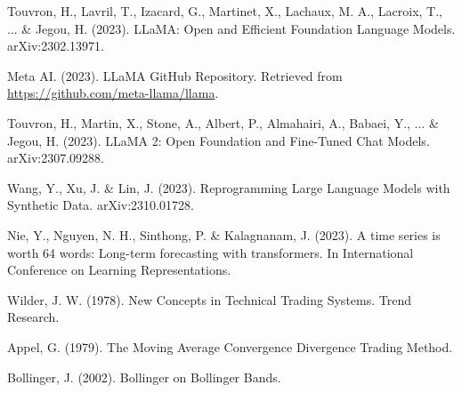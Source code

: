 \begin{thebibliography}{99}
	 Touvron, H., Lavril, T., Izacard, G., Martinet, X., Lachaux, M. A., Lacroix, T., ... \& Jegou, H. (2023). LLaMA: Open and Efficient Foundation Language Models. arXiv:2302.13971.

	 Meta AI. (2023). LLaMA GitHub Repository. Retrieved from \url{https://github.com/meta-llama/llama}.

	 Touvron, H., Martin, X., Stone, A., Albert, P., Almahairi, A., Babaei, Y., ... \& Jegou, H. (2023). LLaMA 2: Open Foundation and Fine-Tuned Chat Models. arXiv:2307.09288.

	 Wang, Y., Xu, J. \& Lin, J. (2023). Reprogramming Large Language Models with Synthetic Data. arXiv:2310.01728.

	 Nie, Y., Nguyen, N. H., Sinthong, P. \& Kalagnanam, J. (2023). A time series is worth 64 words: Long-term forecasting with transformers. In International Conference on Learning Representations.

	Wilder, J. W. (1978).
	New Concepts in Technical Trading Systems.
	Trend Research.

	Appel, G. (1979).
	The Moving Average Convergence Divergence Trading Method.

	Bollinger, J. (2002).
	Bollinger on Bollinger Bands.
\end{thebibliography}
